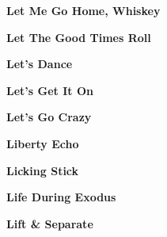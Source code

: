 \newline
\vspace{10pt} 
\begin{center}\textbf{Let Me Go Home, Whiskey}\end{center}
\newline
\vspace{10pt} 
\begin{center}\textbf{Let The Good Times Roll}\end{center}
\newline
\vspace{10pt} 
\begin{center}\textbf{Let's Dance}\end{center}
\newline
\vspace{10pt} 
\begin{center}\textbf{Let's Get It On}\end{center}
\newline
\vspace{10pt} 
\begin{center}\textbf{Let's Go Crazy}\end{center}
\newline
\vspace{10pt} 
\begin{center}\textbf{Liberty Echo}\end{center}
\newline
\vspace{10pt} 
\begin{center}\textbf{Licking Stick}\end{center}
\newline
\vspace{10pt} 
\begin{center}\textbf{Life During Exodus}\end{center}
\newline
\vspace{10pt} 
\begin{center}\textbf{Lift \& Separate}\end{center}
\newline
\vspace{10pt} 
